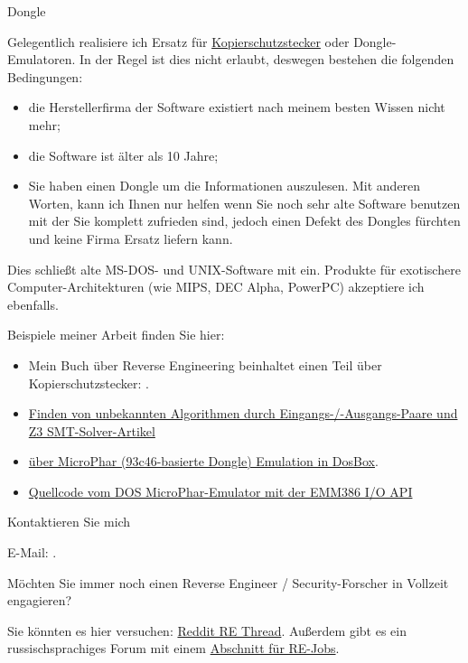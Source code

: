 \large Dongle \normalsize

Gelegentlich realisiere ich Ersatz für
\href{https://en.wikipedia.org/wiki/Software_protection_dongle}{Kopierschutzstecker} oder Dongle-Emulatoren.
In der Regel ist dies nicht erlaubt, deswegen bestehen die folgenden Bedingungen:

\begin{itemize}
\item die Herstellerfirma der Software existiert nach meinem besten Wissen nicht mehr;
\item die Software ist älter als 10 Jahre;
\item Sie haben einen Dongle um die Informationen auszulesen. Mit anderen Worten, kann ich Ihnen
nur helfen wenn Sie noch sehr alte Software benutzen mit der Sie komplett zufrieden sind, jedoch
einen Defekt des Dongles fürchten und keine Firma Ersatz liefern kann.
\end{itemize}

Dies schließt alte MS-DOS- und UNIX-Software mit ein. Produkte für exotischere Computer-Architekturen
(wie MIPS, DEC Alpha, PowerPC) akzeptiere ich ebenfalls.

Beispiele meiner Arbeit finden Sie hier:

\begin{itemize}
\item Mein Buch über Reverse Engineering beinhaltet einen Teil über Kopierschutzstecker: .
\item \href{http://yurichev.com/writings/z3_rockey.pdf}{Finden von unbekannten Algorithmen durch Eingangs-/-Ausgangs-Paare
und Z3 SMT-Solver-Artikel}
\item \href{http://yurichev.com/blog/56/}{über MicroPhar (93c46-basierte Dongle) Emulation in DosBox}.
\item \href{http://conus.info/dongle/src/microph.asm}{Quellcode vom DOS MicroPhar-Emulator mit der EMM386 I/O API}
\end{itemize}

\large Kontaktieren Sie mich \normalsize

E-Mail: \GTT{\EMAILS}.

\large Möchten Sie immer noch einen Reverse Engineer / Security-Forscher in Vollzeit engagieren? \normalsize

Sie könnten es hier versuchen: \href{https://www.reddit.com/r/ReverseEngineering/comments/49cza0/rreverseengineerings_2015_triannual_hiring_thread/}{Reddit RE Thread}.
Außerdem gibt es ein russischsprachiges Forum mit einem \href{https://forum.reverse4you.org/forumdisplay.php?f=252}{Abschnitt für RE-Jobs}.

\vspace*{\fill}
\vfill
